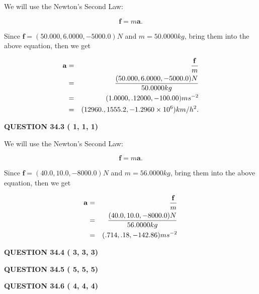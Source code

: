 \documentclass[12pt]{article}
\begin{document}
We will use the Newton's Second Law:
 
\[
\mathbf{f}=m\mathbf{a}.
\]
 
Since $\mathbf{f}=( %
50.000,  %
6.0000,  %
-5000.0 )N$
and $m= %
50.0000kg$, bring them into the above equation, then we get
 
\begin{eqnarray*}
\mathbf{a}&=&\frac{\mathbf{f}}m  \\
&=&\frac{(
50.000 ,
6.0000 ,
-5000.0 )N
}{ %
50.0000 kg}  \\
&=&(
1.0000 ,
.12000,
-100.00
)ms^{-2} \\
&=&(
12960. ,
1555.2 ,
-1.2960 \times 10^{6}
)km/h^2.
\end{eqnarray*}
 
 
 
  
\vspace{0.2in}
  
{\textbf{\Large{QUESTION
34.3 
 (          1,          1,          1)
}}}
  
  


 
 

We will use the Newton's Second Law:
 
\[
\mathbf{f}=m\mathbf{a}.
\]
 
Since $\mathbf{f}= %
(40.0 , 10.0 , -8000.0) N$
and $m= %
56.0000kg$, bring them into the above equation, then we get
 
\begin{eqnarray*}
\mathbf{a}&=&\frac{\mathbf{f}}m  \\
&=&\frac{ %
(40.0 , 10.0 , -8000.0) N}{ %
56.0000kg}  \\
&=& %
(.714 , .18 , -142.86) ms^{-2}
\end{eqnarray*}
 
 
 
  
\vspace{0.2in}
  
{\textbf{\Large{QUESTION
34.4 
 (          3,          3,          3)
}}}
  
  
  
\vspace{0.2in}
  
{\textbf{\Large{QUESTION
34.5 
 (          5,          5,          5)
}}}
  
  
  
\vspace{0.2in}
  
{\textbf{\Large{QUESTION
34.6 
 (          4,          4,          4)
}}}
  
\end{document}

